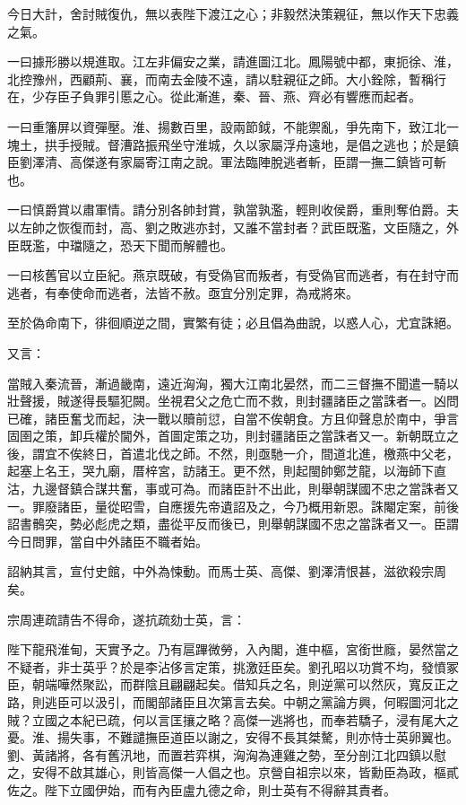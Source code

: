 \begin{pinyinscope}
今日大計，舍討賊復仇，無以表陛下渡江之心；非毅然決策親征，無以作天下忠義之氣。

一曰據形勝以規進取。江左非偏安之業，請進圖江北。鳳陽號中都，東扼徐、淮，北控豫州，西顧荊、襄，而南去金陵不遠，請以駐親征之師。大小銓除，暫稱行在，少存臣子負罪引慝之心。從此漸進，秦、晉、燕、齊必有響應而起者。

一曰重籓屏以資彈壓。淮、揚數百里，設兩節鉞，不能禦亂，爭先南下，致江北一塊土，拱手授賊。督漕路振飛坐守淮城，久以家屬浮舟遠地，是倡之逃也；於是鎮臣劉澤清、高傑遂有家屬寄江南之說。軍法臨陣脫逃者斬，臣謂一撫二鎮皆可斬也。

一曰慎爵賞以肅軍情。請分別各帥封賞，孰當孰濫，輕則收侯爵，重則奪伯爵。夫以左帥之恢復而封，高、劉之敗逃亦封，又誰不當封者？武臣既濫，文臣隨之，外臣既濫，中璫隨之，恐天下聞而解體也。

一曰核舊官以立臣紀。燕京既破，有受偽官而叛者，有受偽官而逃者，有在封守而逃者，有奉使命而逃者，法皆不赦。亟宜分別定罪，為戒將來。

至於偽命南下，徘徊順逆之間，實繁有徒；必且倡為曲說，以惑人心，尤宜誅絕。

又言：

當賊入秦流晉，漸過畿南，遠近洶洶，獨大江南北晏然，而二三督撫不聞遣一騎以壯聲援，賊遂得長驅犯闕。坐視君父之危亡而不救，則封疆諸臣之當誅者一。凶問已確，諸臣奮戈而起，決一戰以贖前愆，自當不俟朝食。方且仰聲息於南中，爭言固圉之策，卸兵權於閫外，首圖定策之功，則封疆諸臣之當誅者又一。新朝既立之後，謂宜不俟終日，首遣北伐之師。不然，則亟馳一介，間道北進，檄燕中父老，起塞上名王，哭九廟，厝梓宮，訪諸王。更不然，則起閩帥鄭芝龍，以海師下直沽，九邊督鎮合謀共奮，事或可為。而諸臣計不出此，則舉朝謀國不忠之當誅者又一。罪廢諸臣，量從昭雪，自應援先帝遺詔及之，今乃概用新恩。誅閹定案，前後詔書鶻突，勢必彪虎之類，盡從平反而後已，則舉朝謀國不忠之當誅者又一。臣謂今日問罪，當自中外諸臣不職者始。

詔納其言，宣付史館，中外為悚動。而馬士英、高傑、劉澤清恨甚，滋欲殺宗周矣。

宗周連疏請告不得命，遂抗疏劾士英，言：

陛下龍飛淮甸，天實予之。乃有扈蹕微勞，入內閣，進中樞，宮銜世廕，晏然當之不疑者，非士英乎？於是李沾侈言定策，挑激廷臣矣。劉孔昭以功賞不均，發憤冢臣，朝端嘩然聚訟，而群陰且翩翩起矣。借知兵之名，則逆黨可以然灰，寬反正之路，則逃臣可以汲引，而閣部諸臣且次第言去矣。中朝之黨論方興，何暇圖河北之賊？立國之本紀已疏，何以言匡攘之略？高傑一逃將也，而奉若驕子，浸有尾大之憂。淮、揚失事，不難譴撫臣道臣以謝之，安得不長其桀驁，則亦恃士英卵翼也。劉、黃諸將，各有舊汛地，而置若弈棋，洶洶為連雞之勢，至分剖江北四鎮以慰之，安得不啟其雄心，則皆高傑一人倡之也。京營自祖宗以來，皆勳臣為政，樞貳佐之。陛下立國伊始，而有內臣盧九德之命，則士英有不得辭其責者。


\end{pinyinscope}
